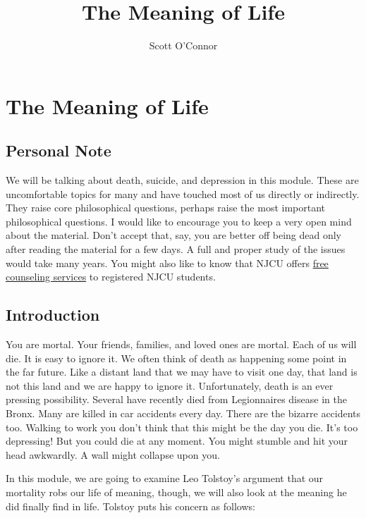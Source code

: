 \documentclass[]{article}
\title{The Meaning of Life}
\author{Scott O’Connor}
\begin{document}
\maketitle

\section{The Meaning of Life}\label{the-meaning-of-life}

\subsection{Personal Note}\label{personal-note}

We will be talking about death, suicide, and depression in this module.
These are uncomfortable topics for many and have touched most of us
directly or indirectly. They raise core philosophical questions, perhaps
raise the most important philosophical questions. I would like to
encourage you to keep a very open mind about the material. Don't accept
that, say, you are better off being dead only after reading the material
for a few days. A full and proper study of the issues would take many
years. You might also like to know that NJCU offers
\href{http://www.njcu.edu/counselingcenter}{free counseling services} to
registered NJCU students.

\subsection{Introduction}\label{introduction}

You are mortal. Your friends, families, and loved ones are mortal. Each
of us will die. It is easy to ignore it. We often think of death as
happening some point in the far future. Like a distant land that we may
have to visit one day, that land is not this land and we are happy to
ignore it. Unfortunately, death is an ever pressing possibility. Several
have recently died from Legionnaires disease in the Bronx. Many are
killed in car accidents every day. There are the bizarre accidents too.
Walking to work you don't think that this might be the day you die. It's
too depressing! But you could die at any moment. You might stumble and
hit your head awkwardly. A wall might collapse upon you.

In this module, we are going to examine Leo Tolstoy's argument that our
mortality robs our life of meaning, though, we will also look at the
meaning he did finally find in life. Tolstoy puts his concern as
follows:
\end{document}
